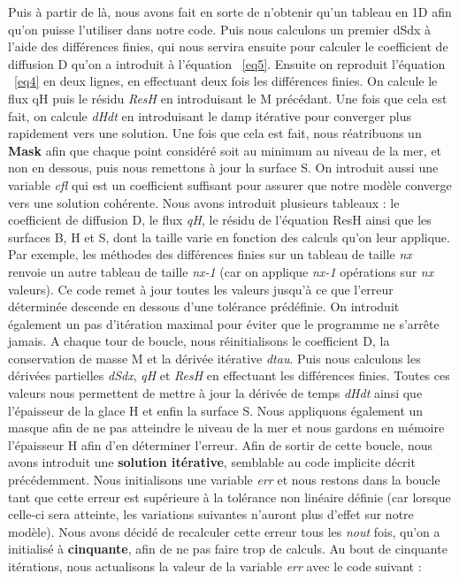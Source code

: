 \documentclass{article}
\begin{document}
\newpage
Puis à partir de là, nous avons fait en sorte de n'obtenir qu'un tableau en 1D afin qu'on puisse l'utiliser dans notre code. Puis nous calculons un premier dSdx à l'aide des différences finies, qui nous servira ensuite pour calculer le coefficient de diffusion D qu'on a introduit à l'équation ~\eqref{eq5}. Ensuite on reproduit l'équation ~\eqref{eq4} en deux lignes, en effectuant deux fois les différences finies. On calcule le flux qH puis le résidu \textit{ResH} en introduisant le M précédant. Une fois que cela est fait, on calcule \textit{dHdt} en introduisant le damp itérative pour converger plus rapidement vers une solution. Une fois que cela est fait, nous réatribuons un \textbf{Mask} afin que chaque point considéré soit au minimum au niveau de la mer, et non en dessous, puis nous remettons à jour la surface S. On introduit aussi une variable \textit{cfl} qui est un coefficient suffisant pour assurer que notre modèle converge vers une solution cohérente.
\newline
\newline
Nous avons introduit plusieurs tableaux : le coefficient de diffusion D, le flux \textit{qH}, le résidu de l'équation ResH ainsi que les surfaces B, H et S, dont la taille varie en fonction des calculs qu'on leur applique. Par exemple, les méthodes des différences finies sur un tableau de taille \textit{nx} renvoie un autre tableau de taille \textit{nx-1} (car on applique \textit{nx-1} opérations sur \textit{nx} valeurs).
\newline
\newline
Ce code remet à jour toutes les valeurs jusqu'à ce que l'erreur déterminée descende en dessous d'une tolérance prédéfinie. On introduit également un pas d'itération maximal pour éviter que le programme ne s'arrête jamais.
\newline
\newline
A chaque tour de boucle, nous réinitialisons le coefficient D, la conservation de masse M et la dérivée itérative \textit{dtau}. Puis nous calculons les dérivées partielles \textit{dSdx}, \textit{qH} et \textit{ResH} en effectuant les différences finies. Toutes ces valeurs nous permettent de mettre à jour la dérivée de temps \textit{dHdt} ainsi que l'épaisseur de la glace H et enfin la surface S. Nous appliquons également un masque afin de ne pas atteindre le niveau de la mer et nous gardons en mémoire l'épaisseur H afin d'en déterminer l'erreur.
\newpage
Afin de sortir de cette boucle, nous avons introduit une \textbf{solution itérative}, semblable au code implicite décrit précédemment. Nous initialisons une variable \textit{err} et nous restons dans la boucle tant que cette erreur est supérieure à la tolérance non linéaire définie (car lorsque celle-ci sera atteinte, les variations suivantes n'auront plus d'effet sur notre modèle). Nous avons décidé de recalculer cette erreur tous les \textit{nout} fois, qu'on a initialisé à \textbf{cinquante}, afin de ne pas faire trop de calculs. Au bout de cinquante itérations, nous actualisons la valeur de la variable \textit{err} avec le code suivant :
\end{document}
